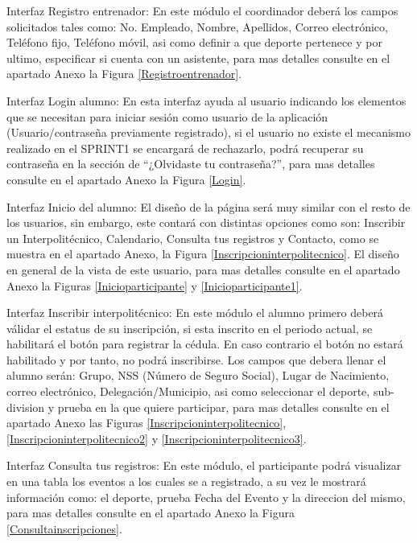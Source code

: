 	\noindent Interfaz Registro entrenador: En este  módulo el coordinador deberá los campos solicitados tales como: No. Empleado, Nombre, Apellidos, Correo electrónico, Teléfono fijo, Teléfono móvil, asi como definir a que deporte pertenece y por ultimo, especificar si cuenta con un asistente, para mas detalles consulte en el apartado Anexo la Figura \ref{Registroentrenador}.
	\newline
	
	\noindent Interfaz Login alumno: En esta interfaz ayuda al usuario indicando los elementos que se necesitan para iniciar sesión como usuario de la aplicación (Usuario/contraseña previamente registrado), si el usuario no existe el mecanismo realizado en el SPRINT1 se encargará de rechazarlo, podrá recuperar su contraseña en la sección de “¿Olvidaste tu contraseña?”, para mas detalles consulte en el apartado Anexo la Figura \ref{Login}.
	\newline
	
	\noindent Interfaz Inicio del alumno: El diseño de la página será muy similar con el resto de los usuarios, sin embargo, este contará con distintas opciones como son: Inscribir un Interpolitécnico, Calendario, Consulta tus registros y Contacto, como se muestra en el apartado Anexo, la Figura 	\ref{Inscripcioninterpolitecnico}. El diseño en general de la vista de este usuario, para mas detalles consulte en el apartado Anexo la Figuras \ref{Inicioparticipante} y \ref{Inicioparticipante1}.
	\newline
	
	\noindent Interfaz Inscribir interpolitécnico: En este módulo el alumno primero deberá válidar el estatus de su inscripción, si esta inscrito en el periodo actual, se habilitará el botón para registrar la cédula. En caso contrario el botón no estará habilitado y por tanto, no podrá inscribirse. Los campos que debera llenar el alumno serán: Grupo, NSS (Número de Seguro Social), Lugar de Nacimiento, correo electrónico, Delegación/Municipio, asi como seleccionar el deporte, sub-division y prueba en la que quiere participar, para mas detalles consulte en el apartado Anexo las Figuras \ref{Inscripcioninterpolitecnico}, \ref{Inscripcioninterpolitecnico2} y \ref{Inscripcioninterpolitecnico3}.
	\newline
	
	\noindent Interfaz Consulta tus registros: En este módulo, el participante podrá visualizar en una tabla los eventos a los cuales se a registrado, a su vez le mostrará información como: el deporte, prueba Fecha del Evento y la direccion del mismo, para mas detalles consulte en el apartado Anexo la Figura \ref{Consultainscripciones}.
	\newline

